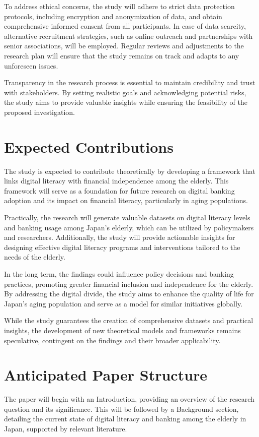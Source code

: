 \documentclass{article} %
\begin{document}
To address ethical concerns, the study will adhere to strict data protection protocols, including encryption and anonymization of data, and obtain comprehensive informed consent from all participants. In case of data scarcity, alternative recruitment strategies, such as online outreach and partnerships with senior associations, will be employed. Regular reviews and adjustments to the research plan will ensure that the study remains on track and adapts to any unforeseen issues.

Transparency in the research process is essential to maintain credibility and trust with stakeholders. By setting realistic goals and acknowledging potential risks, the study aims to provide valuable insights while ensuring the feasibility of the proposed investigation.

\section{Expected Contributions}
\label{sec:contributions}
The study is expected to contribute theoretically by developing a framework that links digital literacy with financial independence among the elderly. This framework will serve as a foundation for future research on digital banking adoption and its impact on financial literacy, particularly in aging populations.

Practically, the research will generate valuable datasets on digital literacy levels and banking usage among Japan's elderly, which can be utilized by policymakers and researchers. Additionally, the study will provide actionable insights for designing effective digital literacy programs and interventions tailored to the needs of the elderly.

In the long term, the findings could influence policy decisions and banking practices, promoting greater financial inclusion and independence for the elderly. By addressing the digital divide, the study aims to enhance the quality of life for Japan's aging population and serve as a model for similar initiatives globally.

While the study guarantees the creation of comprehensive datasets and practical insights, the development of new theoretical models and frameworks remains speculative, contingent on the findings and their broader applicability.

\section{Anticipated Paper Structure}
\label{sec:structure}
The paper will begin with an Introduction, providing an overview of the research question and its significance. This will be followed by a Background section, detailing the current state of digital literacy and banking among the elderly in Japan, supported by relevant literature.
\end{document}
